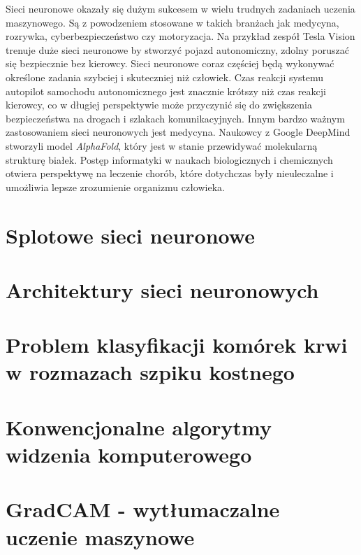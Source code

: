 Sieci neuronowe okazały się dużym sukcesem w wielu trudnych zadaniach uczenia maszynowego.
Są z powodzeniem stosowane w takich branżach jak medycyna, rozrywka, cyberbezpieczeństwo czy motoryzacja. Na przykład zespół Tesla Vision trenuje duże sieci neuronowe by stworzyć pojazd autonomiczny, zdolny poruszać się bezpiecznie bez kierowcy.
Sieci neuronowe coraz częściej będą wykonywać określone zadania szybciej i skuteczniej niż człowiek.
Czas reakcji systemu autopilot samochodu autonomicznego jest znacznie krótszy niż czas reakcji kierowcy, co w długiej perspektywie może przyczynić się do zwiększenia bezpieczeństwa na drogach i szlakach komunikacyjnych.
Innym bardzo ważnym zastosowaniem sieci neuronowych jest medycyna. Naukowcy z Google DeepMind stworzyli model \textit{AlphaFold}, który jest w stanie przewidywać molekularną strukturę białek.
Postęp informatyki w naukach biologicznych i chemicznych otwiera perspektywę na leczenie chorób, które dotychczas były nieuleczalne i umożliwia lepsze zrozumienie organizmu człowieka.

\section{Splotowe sieci neuronowe}

\section{Architektury sieci neuronowych}

\section{Problem klasyfikacji komórek krwi w rozmazach szpiku kostnego}

\section{Konwencjonalne algorytmy widzenia komputerowego}

\section{GradCAM - wytłumaczalne uczenie maszynowe}